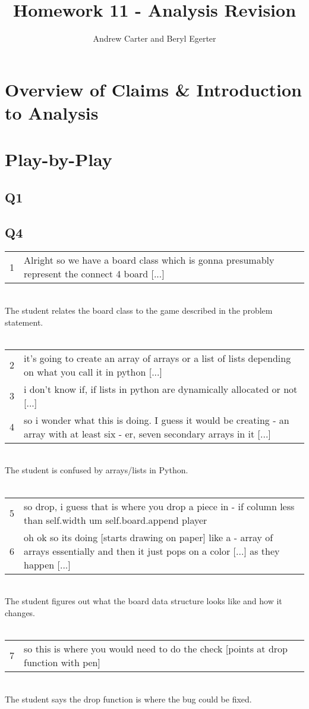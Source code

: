 \documentclass{article}
\title{Homework 11 - Analysis Revision}
\author{Andrew Carter and Beryl Egerter}
\begin{document}
\maketitle
\section{Overview of Claims \& Introduction to Analysis}

\section{Play-by-Play}
\subsection{Q1}
\subsection{Q4}

\begin{tabular}{lp{13cm}}
1& Alright so we have a board class which is gonna presumably represent the connect 4 board [...]\\
\end{tabular} \\
The student relates the board class to the game described in the problem statement. \\ \\
\begin{tabular}{lp{13cm}}
2& it's going to create an array of arrays or a list of lists depending on what you call it in python [...] \\
3& i don't know if, if lists in python are dynamically allocated or not [...] \\
4& so i wonder what this is doing. I guess it would be creating - an array with at least six - er, seven secondary arrays in it [...]\\
\end{tabular}\\
The student is confused by arrays/lists in Python. \\ \\
\begin{tabular}{lp{13cm}}
5& so drop, i guess that is where you drop a piece in - if column less than self.width um self.board.append player \\
6&oh ok so its doing  [starts drawing on paper] like a - array of arrays essentially and then it just pops on a color [...] as they happen [...] \\
\end{tabular}\\
The student figures out what the board data structure looks like and how it changes. \\ \\
\begin{tabular}{lp{13cm}}
7&so this is where you would need to do the check [points at drop function with pen]\\
\end{tabular} \\
The student says the drop function is where the bug could be fixed.
\end{document}
